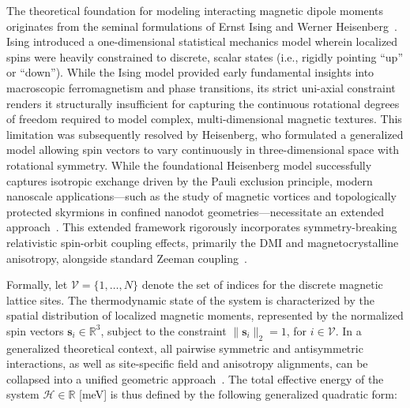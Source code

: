 \documentclass[final,5p,times,twocolumn]{elsarticle}
\begin{document}
The theoretical foundation for modeling interacting magnetic dipole moments originates from the seminal formulations of Ernst Ising and Werner Heisenberg~\cite{agudelo2019study}. Ising introduced a one-dimensional statistical mechanics model wherein localized spins were heavily constrained to discrete, scalar states (i.e., rigidly pointing ``up'' or ``down''). While the Ising model provided early fundamental insights into macroscopic ferromagnetism and phase transitions, its strict uni-axial constraint renders it structurally insufficient for capturing the continuous rotational degrees of freedom required to model complex, multi-dimensional magnetic textures. This limitation was subsequently resolved by Heisenberg, who formulated a generalized model allowing spin vectors to vary continuously in three-dimensional space with rotational symmetry. While the foundational 
Heisenberg model successfully captures isotropic exchange driven by the Pauli exclusion principle, modern nanoscale applications—such as the study of magnetic vortices and topologically protected skyrmions in confined nanodot geometries—necessitate an extended 
approach~\cite{fert2024electrical}. This extended framework rigorously incorporates symmetry-breaking relativistic spin-orbit coupling effects, primarily the DMI and magnetocrystalline anisotropy, alongside standard Zeeman coupling~\cite{borisov2021heisenberg}.

Formally, let $\mathcal{V} = \{1, \dots, N\}$ denote the set of indices for the discrete magnetic lattice sites. The thermodynamic state of the system is characterized by the spatial distribution of localized magnetic moments, represented by the normalized spin vectors $\mathbf{s}_i \in \mathbb{R}^3$, subject to the constraint 
$\|\mathbf{s}_i\|_2 = 1$, for $i\in\mathcal{V}$. In a generalized theoretical context, all pairwise symmetric and antisymmetric interactions, as well as site-specific field and anisotropy alignments, can be collapsed into a unified geometric approach~\cite{moriya1960anisotropic,eriksson2017atomistic}. The total effective energy of the system $\mathcal{H}\in\mathbb{R}$ [meV] is thus defined by the following generalized quadratic form:
\end{document}
